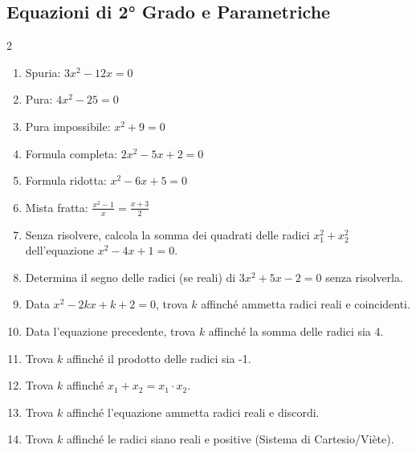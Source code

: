 \subsection{Equazioni di 2° Grado e Parametriche}
\begin{multicols}{2}
\begin{enumerate}
    \item {} Spuria: $3x^2 - 12x = 0$
    \item {} Pura: $4x^2 - 25 = 0$
    \item {} Pura impossibile: $x^2 + 9 = 0$
    \item {} Formula completa: $2x^2 - 5x + 2 = 0$
    \item {} Formula ridotta: $x^2 - 6x + 5 = 0$
    \item {} Mista fratta: $\frac{x^2-1}{x} = \frac{x+3}{2}$
    \item {} Senza risolvere, calcola la somma dei quadrati delle radici $x_1^2 + x_2^2$ dell'equazione $x^2 - 4x + 1 = 0$.
    \item {} Determina il segno delle radici (se reali) di $3x^2 + 5x - 2 = 0$ senza risolverla.
    \item {} Data $x^2 - 2kx + k + 2 = 0$, trova $k$ affinché ammetta radici reali e coincidenti.
    \item {} Data l'equazione precedente, trova $k$ affinché la somma delle radici sia 4.
    \item {} Trova $k$ affinché il prodotto delle radici sia -1.
    \item {} Trova $k$ affinché $x_1 + x_2 = x_1 \cdot x_2$.
    \item {} Trova $k$ affinché l'equazione ammetta radici reali e discordi.
    \item {} Trova $k$ affinché le radici siano reali e positive (Sistema di Cartesio/Viète).
\end{enumerate}
\end{multicols}

